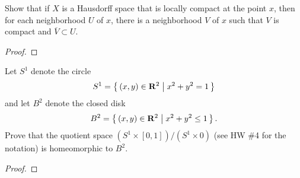 \newpage
\begin{problem}[Munkres \S29, Ex.\,10]
Show that if $X$ is a Hausdorff space that is locally compact at
the point $x$, then for each neighborhood $U$ of $x$, there is a
neighborhood $V$ of $x$ such that $V$ is compact and $\overline
V\subset U$.
\end{problem}
\begin{proof}
\end{proof}
\newpage
\begin{problem}[A]
Let $S^1$ denote the circle
\[
S^1=\left\{\,(x,y)\in\mathbf{R}^2\;\middle|\;x^2+y^2=1\,\right\}
\]
and let $B^2$ denote the closed disk
\[
B^2=\left\{\,(x,y)\in\mathbf{R}^2\;\middle|\;x^2+y^2\leq 1\,\right\}.
\]
Prove that the quotient space $(S^1\times[0,1])/(S^1\times 0)$
(see HW \#4 for the notation) is homeomorphic to $B^2$.
\end{problem}
\begin{proof}
\end{proof}

